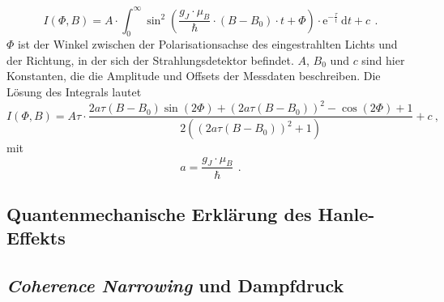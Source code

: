\begin{equation}
\label{eq:int}
I(\Phi,B) = A \cdot \int_0^{\infty} \sin^2 \left( \frac{g_J \cdot \mu_B}{\hbar} \cdot (B-B_0) \cdot t + \Phi \right) \cdot
\text{e}^{-\frac{\tau}{t}} \ \text{d}t + c \, \ .
\end{equation}
$\Phi$ ist der Winkel zwischen der Polarisationsachse des eingestrahlten Lichts und der Richtung,
in der sich der Strahlungsdetektor befindet.
$A$, $B_0$ und $c$ sind hier Konstanten, die die Amplitude und Offsets der Messdaten beschreiben.
Die Lösung des Integrals lautet
\begin{equation}
\label{eq:intensity}
I(\Phi,B) = A \tau \cdot \frac{2 a \tau  (B-B_0) \sin (2 \Phi )+(2 a \tau  (B-B_0))^2-\cos (2 \Phi )+1}
{2 \left((2 a \tau  (B-B_0))^2+1\right)}+c \ ,
\end{equation}
mit
\begin{equation}
\label{}
a=\frac{g_J \cdot \mu_B}{\hbar} \, \ .
\end{equation}

\subsection{Quantenmechanische Erklärung des Hanle-Effekts}

\subsection{\emph{Coherence Narrowing} und Dampfdruck}